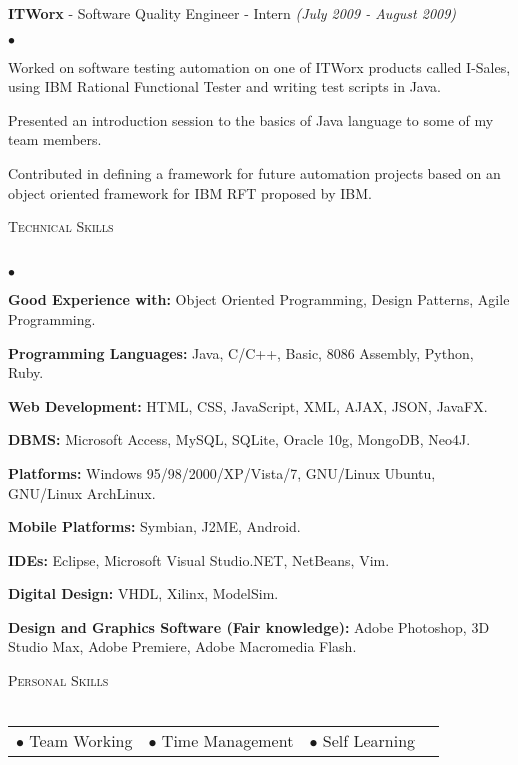 \documentclass[letterpaper,12pt]{article}
\newcommand{\lineunder}{\vspace*{-8pt} \\ \hspace*{-8pt} \hrulefill \\}
\newcommand{\interval}[1]{\textit{(#1)} }
\newcommand{\header}[1]{{\hspace*{0pt}\vspace*{6pt} \textsc{#1}} \vspace*{-6pt} \lineunder}
\newcommand{\employer}[3]{{\textbf{#1} - {#3} \interval{#2}\\ }}
\newenvironment{achievements}{\begin{list}{$\bullet$}{\topsep 0pt \itemsep -2pt}}{\vspace*{4pt}\end{list}}
\begin{document}
\vspace*{4pt}
\employer{ITWorx}{July 2009 - August 2009}{Software Quality Engineer - Intern}
  \begin{achievements}
    \item Worked on software testing automation on one of ITWorx products called I-Sales, using IBM Rational Functional Tester and writing test scripts in Java.
    \item Presented an introduction session to the basics of Java language to some of my team members.
    \item Contributed in defining a framework for future automation projects based on an object oriented framework for IBM RFT proposed by IBM.
  \end{achievements}
\vspace*{4pt}

\newpage

\header{Technical Skills}
\begin{achievements}
  \item \textbf{Good Experience with:} Object Oriented Programming, Design Patterns, Agile Programming.
  \item \textbf{Programming Languages:} Java, C/C++, Basic, 8086 Assembly, Python, Ruby.
  \item \textbf{Web Development:} HTML, CSS, JavaScript, XML, AJAX, JSON, JavaFX.
  \item \textbf{DBMS:} Microsoft Access, MySQL, SQLite, Oracle 10g, MongoDB, Neo4J.
  \item \textbf{Platforms:} Windows 95/98/2000/XP/Vista/7, GNU/Linux Ubuntu, GNU/Linux ArchLinux.
  \item \textbf{Mobile Platforms:} Symbian, J2ME, Android.
  \item \textbf{IDEs:} Eclipse, Microsoft Visual Studio.NET, NetBeans, Vim.
  \item \textbf{Digital Design:} VHDL, Xilinx, ModelSim.
  \item \textbf{Design and Graphics Software (Fair knowledge):} Adobe Photoshop, 3D Studio Max, Adobe Premiere, Adobe Macromedia Flash.
\end{achievements}
\vspace*{4pt}

\header{Personal Skills}
\begin{tabular}{l l l l}
$\bullet$ Team Working& 
$\bullet$ Time Management&
$\bullet$ Self Learning&
\end{tabular}
\vspace*{4pt}
\end{document}
